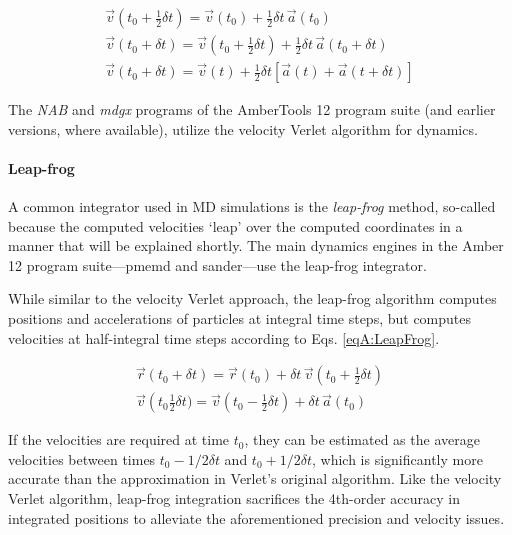\begin{align}
   \vec{v}\left(t_0 + \frac 1 2 \delta t\right) = \vec{v}(t_0) + \frac 1 2
         \delta t \, \vec{a}(t_0) \nonumber \\
   \vec{v}(t_0 + \delta t) = \vec{v}\left(t_0 + \frac 1 2 \delta t\right) +
         \frac 1 2 \delta t \, \vec{a}(t_0 + \delta t) \nonumber \\
   \vec{v}(t_0 + \delta t) = \vec{v}(t) + \frac 1 2 \delta t \left[ \vec{a}(t) +
         \vec{a}(t + \delta t) \right]
   \label{eqA:VelVerletVelocities}
\end{align}

The \emph{NAB} and \emph{mdgx} programs of the AmberTools 12 program suite (and
earlier versions, where available), utilize the velocity Verlet algorithm for
dynamics.

\paragraph{Leap-frog}

A common integrator used in MD simulations is the \emph{leap-frog} method,
so-called because the computed velocities `leap' over the computed coordinates
in a manner that will be explained shortly. The main dynamics engines in the
Amber 12 program suite---pmemd and sander---use the leap-frog integrator.

While similar to the velocity Verlet approach, the leap-frog algorithm computes
positions and accelerations of particles at integral time steps, but
computes velocities at half-integral time steps according to Eqs.
\ref{eqA:LeapFrog}.

\begin{align}
   \vec{r}(t_0 + \delta t) = \vec{r}(t_0) + \delta t \, \vec{v}\left(t_0 + \frac
         1 2 \delta t \right) \nonumber \\
   \vec{v}\left(t_0 \frac 1 2 \delta t) = \vec{v}\left(t_0 - \frac 1 2 \delta t
         \right) + \delta t \, \vec{a}(t_0)
   \label{eqA:LeapFrog}
\end{align}

If the velocities are required at time $t_0$, they can be estimated as the
average velocities between times $t_0 - 1/2\delta t$ and $t_0 + 1/2 \delta t$,
which is significantly more accurate than the approximation in Verlet's original
algorithm. Like the velocity Verlet algorithm, leap-frog integration sacrifices
the 4th-order accuracy in integrated positions to alleviate the aforementioned
precision and velocity issues. \cite{Allen_Tildesley}
